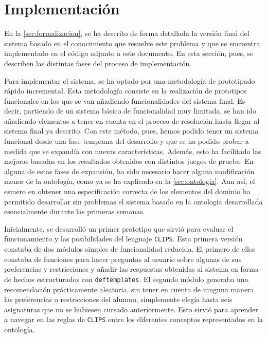 
\section{Implementación} \label{sec:implementacion}

En la \autoref{sec:formalizacion}, se ha descrito de forma detallada la 
versión final del sistema basado en el conocimiento que resuelve este problema 
y que se encuentra implementado en el código adjunto a este documento. En esta 
sección, pues, se describen las distintas fases del proceso de implementación.

Para implementar el sistema, se ha optado por una metodología de prototipado 
rápido incremental. Esta metodología consiste en la realización de prototipos 
funcionales en los que se van añadiendo funcionalidades del sistema final. Es 
decir, partiendo de un sistema básico de funcionalidad muy limitada, se han 
ido añadiendo elementos a tener en cuenta en el proceso de resolución hasta 
llegar al sistema final ya descrito. Con este método, pues, hemos podido tener 
un sistema funcional desde una fase temprana del desarrollo y que se ha podido 
probar a medida que se expandía con nuevas características. Además, esto ha 
facilitado las mejoras basadas en los resultados obtenidos con distintos 
juegos de prueba. En alguna de estas fases de expansión, ha sido necesario 
hacer alguna modificación menor de la ontología, como ya se ha explicado en la 
\autoref{sec:ontologia}. Aun así, el esmero en obtener una especificación 
correcta de los elementos del dominio ha permitido desarrollar sin problemas 
el sistema basado en la ontología desarrollada esencialmente durante las 
primeras semanas.

Inicialmente, se desarrolló un primer prototipo que sirvió para evaluar el 
funcionamiento y las posibilidades del lenguaje \texttt{CLIPS}. Esta primera 
versión constaba de dos módulos simples de funcionalidad reducida. El primero
de ellos constaba de funciones para hacer preguntas al usuario sobre algunas 
de sus preferencias y restricciones y añadir las respuestas obtenidas al 
sistema en forma de hechos estructurados con \texttt{deftemplates}. El segundo 
módulo generaba una recomendación prácticamente aleatoria, sin tener en cuenta 
de ninguna manera las preferencias o restricciones del alumno, simplemente 
elegía hasta seis asignaturas que no se hubiesen cursado anteriormente. Esto 
sirvió para aprender a navegar en las reglas de \texttt{CLIPS} entre los 
diferentes conceptos representados en la ontología.

